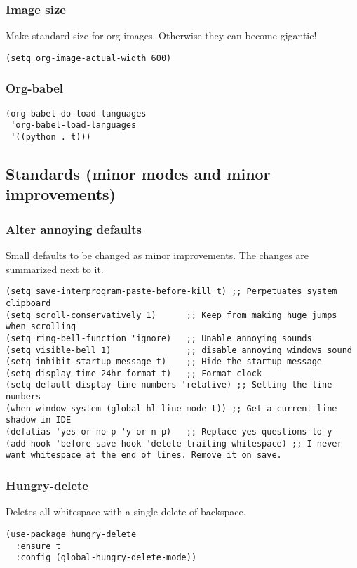 \documentclass[11pt]{article}
\begin{document}
\subsubsection{Image size}
\label{sec:orge888021}
Make standard size for org images. Otherwise they can become gigantic!
\begin{verbatim}
(setq org-image-actual-width 600)
\end{verbatim}
\subsubsection{Org-babel}
\label{sec:orgf4af864}
\begin{verbatim}
(org-babel-do-load-languages
 'org-babel-load-languages
 '((python . t)))
\end{verbatim}
\subsection{Standards (minor modes and minor improvements)}
\label{sec:orgac19acf}
\subsubsection{Alter annoying defaults}
\label{sec:orgd2c9e4e}
Small defaults to be changed as minor improvements. The changes are summarized next to it.
\begin{verbatim}
(setq save-interprogram-paste-before-kill t) ;; Perpetuates system clipboard
(setq scroll-conservatively 1)      ;; Keep from making huge jumps when scrolling
(setq ring-bell-function 'ignore)   ;; Unable annoying sounds
(setq visible-bell 1)               ;; disable annoying windows sound
(setq inhibit-startup-message t)    ;; Hide the startup message
(setq display-time-24hr-format t)   ;; Format clock
(setq-default display-line-numbers 'relative) ;; Setting the line numbers
(when window-system (global-hl-line-mode t)) ;; Get a current line shadow in IDE
(defalias 'yes-or-no-p 'y-or-n-p)   ;; Replace yes questions to y
(add-hook 'before-save-hook 'delete-trailing-whitespace) ;; I never want whitespace at the end of lines. Remove it on save.
\end{verbatim}
\subsubsection{Hungry-delete}
\label{sec:orgcee2e9a}
Deletes all whitespace with a single delete of backspace.
\begin{verbatim}
(use-package hungry-delete
  :ensure t
  :config (global-hungry-delete-mode))
\end{verbatim}
\end{document}
